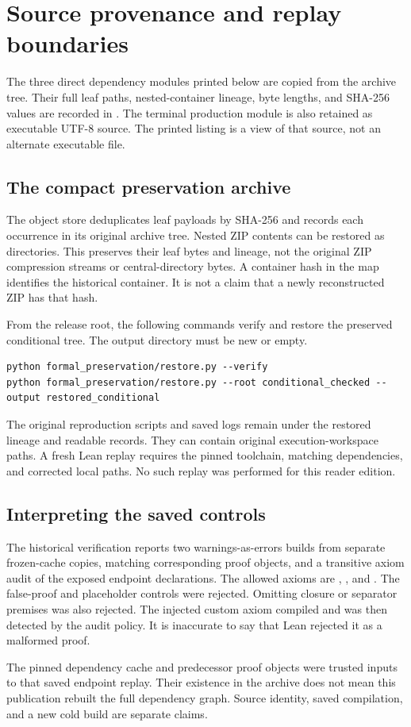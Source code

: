 \clearpage
\section{Source provenance and replay boundaries}
\label{sec:provenance}
The three direct dependency modules printed below are copied from the
 archive tree. Their full leaf paths, nested-container
lineage, byte lengths, and SHA-256 values are recorded in
. The terminal production module is also
retained as executable UTF-8 source. The printed listing is a view of that source,
not an alternate executable file.

\subsection{The compact preservation archive}
The object store deduplicates leaf payloads by SHA-256 and records each occurrence
in its original archive tree. Nested ZIP contents can be restored as directories.
This preserves their leaf bytes and lineage, not the original ZIP compression
streams or central-directory bytes. A container hash in the map identifies the
historical container. It is not a claim that a newly reconstructed ZIP has that hash.

From the release root, the following commands verify and restore the preserved
conditional tree. The output directory must be new or empty.
\begin{Verbatim}[fontsize=\small,breaklines=true]
python formal_preservation/restore.py --verify
python formal_preservation/restore.py --root conditional_checked --output restored_conditional
\end{Verbatim}
The original reproduction scripts and saved logs remain under the restored
lineage and readable records. They can contain original execution-workspace paths.
A fresh Lean replay requires the pinned toolchain, matching dependencies, and
corrected local paths. No such replay was performed for this reader edition.

\subsection{Interpreting the saved controls}
The historical verification reports two warnings-as-errors builds from separate
frozen-cache copies, matching corresponding proof objects, and a transitive axiom
audit of the exposed endpoint declarations. The allowed axioms are
, , and .
The false-proof and placeholder controls were rejected. Omitting closure or
separator premises was also rejected. The injected custom axiom compiled and was
then detected by the audit policy. It is inaccurate to say that Lean rejected it
as a malformed proof.

The pinned dependency cache and predecessor proof objects were trusted inputs to
that saved endpoint replay. Their existence in the archive does not mean this
publication rebuilt the full dependency graph. Source identity, saved compilation,
and a new cold build are separate claims.

